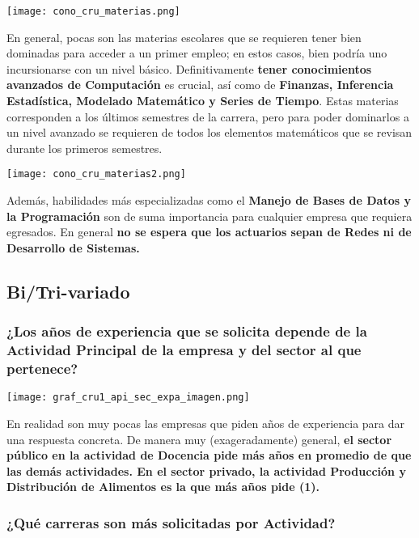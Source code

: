 \documentclass{article}
\begin{document}
\begin{center}
    \texttt{[image: cono\_cru\_materias.png]}
\end{center}

En general, pocas son las materias escolares que se requieren tener bien dominadas para acceder a un primer empleo; en estos casos, bien podría uno incursionarse con un nivel básico. Definitivamente \textbf{tener conocimientos avanzados de Computación} es crucial, así como de \textbf{Finanzas, Inferencia Estadística, Modelado Matemático y Series de Tiempo}. Estas materias corresponden a los últimos semestres de la carrera, pero para poder dominarlos a un nivel avanzado se requieren de todos los elementos matemáticos que se revisan durante los primeros semestres. 


\begin{center}
    \texttt{[image: cono\_cru\_materias2.png]}
\end{center}

Además, habilidades más especializadas como el \textbf{Manejo de Bases de Datos y la Programación} son de suma importancia para cualquier empresa que requiera egresados. En general \textbf{no se espera que los actuarios sepan de Redes ni de Desarrollo de Sistemas.}

\subsection{Bi/Tri-variado}

\subsubsection{¿Los años de experiencia que se solicita depende de la Actividad Principal de la empresa y del sector al que pertenece?}


\begin{center}
    \texttt{[image: graf\_cru1\_api\_sec\_expa\_imagen.png]}
\end{center}

En realidad son muy pocas las empresas que piden años de experiencia para dar una respuesta concreta. De manera muy (exageradamente) general, \textbf{el sector público en la actividad de Docencia pide más años en promedio de que las demás actividades. En el sector privado, la actividad Producción y Distribución de Alimentos es la que más años pide (1).}

\subsubsection{¿Qué carreras son más solicitadas por Actividad?}
\end{document}
